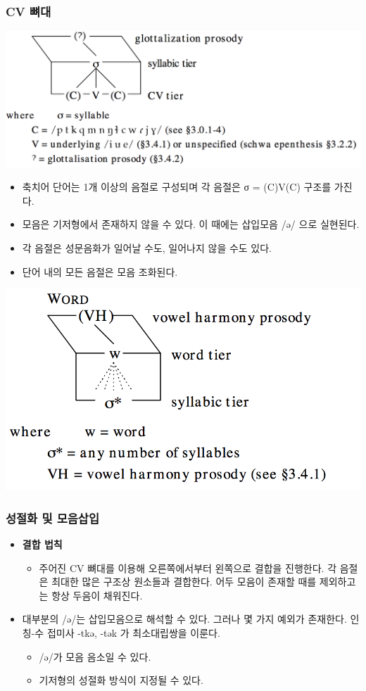\subsubsection{CV 뼈대}
\begin{center}
\includegraphics[width=.8\linewidth]{Chukchi/src/Chukchi-CVskeleton}
\end{center}
\begin{itemize}
\item 축치어 단어는 1개 이상의 음절로 구성되며 각 음절은 σ = (C)V(C) 구조를 가진다.
\item 모음은 기저형에서 존재하지 않을 수 있다. 이 때에는 삽입모음 /ə/ 으로 실현된다.
\item 각 음절은 성문음화가 일어날 수도, 일어나지 않을 수도 있다.
\item 단어 내의 모든 음절은 모음 조화된다. 
\end{itemize}
\begin{center}
\includegraphics[width=.6\linewidth]{Chukchi/src/Chukchi-VH}
\end{center}

\subsubsection{성절화 및 모음삽입}
\begin{itemize}
\item \textbf{결합 법칙}
\begin{itemize}
\item 주어진 CV 뼈대를 이용해 오른쪽에서부터 왼쪽으로 결합을 진행한다. 각 음절은 최대한 많은 구조상 원소들과 결합한다. 어두 모음이 존재할 때를 제외하고는 항상 두음이 채워진다.
\end{itemize}
\item 대부분의 /ə/는 삽입모음으로 해석할 수 있다. 그러나 몇 가지 예외가 존재한다. 인칭-수 접미사 -tkə, -tək 가 최소대립쌍을 이룬다.
\begin{itemize}
\item /ə/가 모음 음소일 수 있다.
\item 기저형의 성절화 방식이 지정될 수 있다. 
\end{itemize}
\end{itemize}

